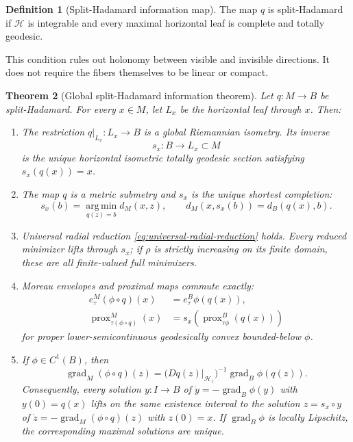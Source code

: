 \documentclass[10pt]{article}
\theoremstyle{plain}
\newtheorem{theorem}{Theorem}[section]
\theoremstyle{definition}
\newtheorem{definition}[theorem]{Definition}
\theoremstyle{remark}
\newcommand{\prox}{\operatorname{prox}}
\newcommand{\argminop}{\operatorname*{arg\,min}}
\begin{document}
\begin{definition}[Split-Hadamard information map]
\label{def:split-hadamard}
The map \(q\) is split-Hadamard if \(\mathcal H\) is integrable and every
maximal horizontal leaf is complete and totally geodesic.
\end{definition}

This condition rules out holonomy between visible and invisible directions.
It does not require the fibers themselves to be linear or compact.

\begin{theorem}[Global split-Hadamard information theorem]
\label{thm:split-hadamard}
Let \(q:M\to B\) be split-Hadamard.  For every \(x\in M\), let \(L_x\) be
the horizontal leaf through \(x\).  Then:
\begin{enumerate}[label=(\roman*),leftmargin=*]
  \item The restriction \(q|_{L_x}:L_x\to B\) is a global Riemannian
  isometry.  Its inverse
  \[
    s_x:B\to L_x\subset M
  \]
  is the unique horizontal isometric totally geodesic section satisfying
  \(s_x(q(x))=x\).
  \item The map \(q\) is a metric submetry and \(s_x\) is the unique shortest
  completion:
  \begin{equation}
    s_x(b)=\argminop_{q(z)=b}d_M(x,z),
    \qquad
    d_M(x,s_x(b))=d_B(q(x),b).
    \label{eq:split-shortest-lift}
  \end{equation}
  \item Universal radial reduction \eqref{eq:universal-radial-reduction}
  holds.  Every reduced minimizer lifts through \(s_x\); if \(\rho\) is
  strictly increasing on its finite domain, these are all finite-valued full
  minimizers.
  \item Moreau envelopes and proximal maps commute exactly:
  \begin{align}
    e_\tau^M(\phi\circ q)(x)&=e_\tau^B\phi(q(x)),
    \label{eq:split-moreau}\\
    \prox^M_{\tau(\phi\circ q)}(x)
    &=s_x\!\left(\prox^B_{\tau\phi}(q(x))\right)
    \label{eq:split-prox}
  \end{align}
  for proper lower-semicontinuous geodesically convex bounded-below
  \(\phi\).
  \item If \(\phi\in C^1(B)\), then
  \begin{equation}
    \operatorname{grad}_M(\phi\circ q)(z)
    =
    \bigl(Dq(z)|_{\mathcal H_z}\bigr)^{-1}
    \operatorname{grad}_B\phi(q(z)).
    \label{eq:split-gradient}
  \end{equation}
  Consequently, every solution \(y:I\to B\) of
  \(\dot y=-\operatorname{grad}_B\phi(y)\) with \(y(0)=q(x)\) lifts on the
  same existence interval to the solution
  \(z=s_x\circ y\) of
  \(\dot z=-\operatorname{grad}_M(\phi\circ q)(z)\) with \(z(0)=x\).
  If \(\operatorname{grad}_B\phi\) is locally Lipschitz, the corresponding
  maximal solutions are unique.
\end{enumerate}
\end{theorem}
\end{document}
